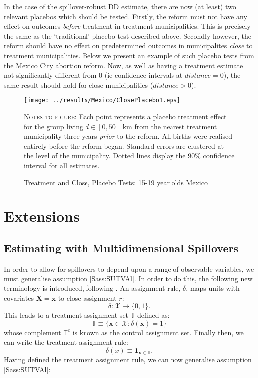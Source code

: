 \documentclass{article}
\begin{document}
\begin{spacing}{1.1}
In the case of the spillover-robust DD estimate, there are now (at least) two
relevant placebos which should be tested.  Firstly, the reform must not have any
effect on outcomes \emph{before} treatment in treatment municipalities.  This is
precisely the same as the `traditional' placebo test described above.  Secondly
however, the reform should have no effect on predetermined outcomes in municipalites
\emph{close} to treatment municipalities.  Below we present an example of such 
placebo tests from the Mexico City abortion reform.  Now, as well as having a 
treatment estimate not significantly different from 0 (ie confidence intervals
at $distance=0$), the same result should hold for close municipalities ($distance>0$).
\begin{figure}[htpb!]
\texttt{[image: ../results/Mexico/ClosePlacebo1.eps]}
\caption{Treatment and Close, Placebo Tests: 15-19 year olds Mexico}
\label{SFig:MexClose}
\vspace{2mm}
\begin{footnotesize}
\textsc{Notes to figure}: Each point represents a placebo treatment effect for the 
group living $d\in [0,50]$ km from the nearest treatment municipality three years
\emph{prior} to the reform.  All births were realised entirely before the reform
began.  Standard errors are clustered at the level of the municipality.  Dotted 
lines display the 90\% confidence interval for all estimates.
\end{footnotesize}
\end{figure}


\section{Extensions}
\label{Sscn:extend}
\subsection{Estimating with Multidimensional Spillovers}
In order to allow for spillovers to depend upon a range of observable variables,
we must generalise assumption \ref{Sass:SUTVAl}.  In order to do this, the
following new terminology is introduced, following \citet{Zajonc2012}. An 
assignment rule, $\delta$, maps units with covariates $\mathbf{X=x}$ to close
assignment $r$:
\[
\delta: \mathcal{X} \rightarrow \{0,1\}.
\]
This leads to a treatment assignment set $\mathbb{T}$ defined as:
\[
\mathbb{T}\equiv \{ \mathbf{x}\in\mathcal{X}: \delta(\mathbf{x})=1 \}
\]
whose complement $\mathbb{T}^c$ is known as the control assignment
set. Finally then, we can write the treatment assignment rule:
\begin{equation}
\delta(x)\equiv \mathbf{1}_{\mathbf{x}\in\mathbb{T}}.
\end{equation}
Having defined the treatment assignment rule, we can now generalise
assumption \ref{Sass:SUTVAl}:


\end{spacing}
\end{document}
